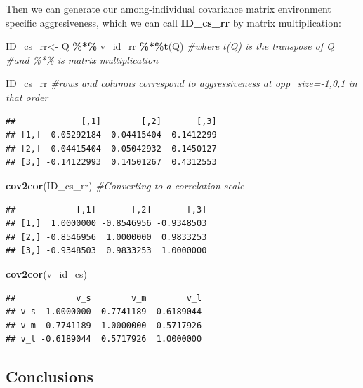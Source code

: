 \documentclass[
  12pt,
]{book}
\newenvironment{Shaded}{\begin{snugshade}}{\end{snugshade}}
\newcommand{\CommentTok}[1]{\textcolor[rgb]{0.56,0.35,0.01}{\textit{#1}}}
\newcommand{\KeywordTok}[1]{\textcolor[rgb]{0.13,0.29,0.53}{\textbf{#1}}}
\newcommand{\NormalTok}[1]{#1}
\newcommand{\OperatorTok}[1]{\textcolor[rgb]{0.81,0.36,0.00}{\textbf{#1}}}
\newcommand{\StringTok}[1]{\textcolor[rgb]{0.31,0.60,0.02}{#1}}
\begin{document}
Then we can generate our among-individual covariance matrix environment specific aggresiveness, which we can call \textbf{ID\_cs\_rr} by matrix multiplication:

\begin{Shaded}
\begin{Highlighting}[]
\NormalTok{ID\_cs\_rr\textless{}{-}}\StringTok{ }\NormalTok{Q }\OperatorTok{\%*\%}\StringTok{ }\NormalTok{v\_id\_rr }\OperatorTok{\%*\%}\KeywordTok{t}\NormalTok{(Q)    }\CommentTok{\#where t(Q) is the transpose of Q}
                               \CommentTok{\#and \%*\% is matrix multiplication}

\NormalTok{ID\_cs\_rr  }\CommentTok{\#rows and columns correspond to aggressiveness at opp\_size={-}1,0,1 in that order}
\end{Highlighting}
\end{Shaded}

\begin{verbatim}
##             [,1]        [,2]       [,3]
## [1,]  0.05292184 -0.04415404 -0.1412299
## [2,] -0.04415404  0.05042932  0.1450127
## [3,] -0.14122993  0.14501267  0.4312553
\end{verbatim}

\begin{Shaded}
\begin{Highlighting}[]
\KeywordTok{cov2cor}\NormalTok{(ID\_cs\_rr)   }\CommentTok{\#Converting to a correlation scale}
\end{Highlighting}
\end{Shaded}

\begin{verbatim}
##            [,1]       [,2]       [,3]
## [1,]  1.0000000 -0.8546956 -0.9348503
## [2,] -0.8546956  1.0000000  0.9833253
## [3,] -0.9348503  0.9833253  1.0000000
\end{verbatim}

\begin{Shaded}
\begin{Highlighting}[]
\KeywordTok{cov2cor}\NormalTok{(v\_id\_cs)}
\end{Highlighting}
\end{Shaded}

\begin{verbatim}
##            v_s        v_m        v_l
## v_s  1.0000000 -0.7741189 -0.6189044
## v_m -0.7741189  1.0000000  0.5717926
## v_l -0.6189044  0.5717926  1.0000000
\end{verbatim}

\hypertarget{conclusions-2}{%
\subsection{Conclusions}\label{conclusions-2}}
\end{document}
